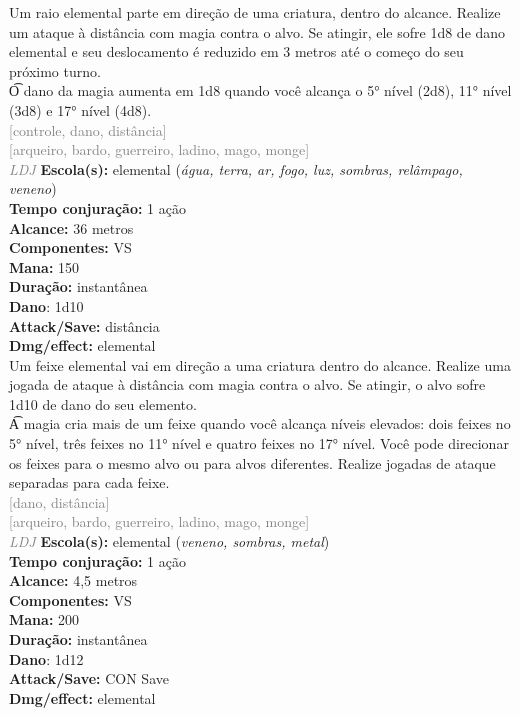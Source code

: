 \documentclass{RPG_Adventure}[2021/10/20]
\begin{document}
{\normalsize Um raio elemental parte em direção de uma criatura, dentro do alcance. Realize um ataque à distância com magia contra o alvo. Se atingir, ele sofre 1d8 de dano elemental e seu deslocamento é reduzido em 3 metros até o começo do seu próximo turno.\\\t O dano da magia aumenta em 1d8 quando você alcança o 5° nível (2d8), 11° nível (3d8) e 17° nível (4d8).\\}
{\scriptsize \textcolor{gray}{[controle, dano, distância]\\}}
{\scriptsize \textcolor{gray}{[arqueiro, bardo, guerreiro, ladino, mago, monge]\\}}
{\tiny \textcolor{gray}{\textit{LDJ}}}\jump{}
{\small \t \textbf{Escola(s):} elemental (\textit{água, terra, ar, fogo, luz, sombras, relâmpago, veneno})\\\t \textbf{Tempo conjuração:} 1 ação\\\t \textbf{Alcance:} 36 metros\\\t \textbf{Componentes:} VS\\\t \textbf{Mana:} 150\\\t \textbf{Duração:} instantânea\\\t \textbf{Dano}: 1d10\\\t \textbf{Attack/Save:} distância\\\t \textbf{Dmg/effect:} elemental\\}
{\normalsize Um feixe elemental vai em direção a uma criatura dentro do alcance. Realize uma jogada de ataque à distância com magia contra o alvo. Se atingir, o alvo sofre 1d10 de dano do seu elemento.\\\t A magia cria mais de um feixe quando você alcança níveis elevados: dois feixes no 5° nível, três feixes no 11° nível e quatro feixes no 17° nível. Você pode direcionar os feixes para o mesmo alvo ou para alvos diferentes. Realize jogadas de ataque separadas para cada feixe.\\}
{\scriptsize \textcolor{gray}{[dano, distância]\\}}
{\scriptsize \textcolor{gray}{[arqueiro, bardo, guerreiro, ladino, mago, monge]\\}}
{\tiny \textcolor{gray}{\textit{LDJ}}}\jump{}
{\small \t \textbf{Escola(s):} elemental (\textit{veneno, sombras, metal})\\\t \textbf{Tempo conjuração:} 1 ação\\\t \textbf{Alcance:} 4,5 metros\\\t \textbf{Componentes:} VS\\\t \textbf{Mana:} 200\\\t \textbf{Duração:} instantânea\\\t \textbf{Dano}: 1d12\\\t \textbf{Attack/Save:} CON Save\\\t \textbf{Dmg/effect:} elemental\\}
\end{document}
